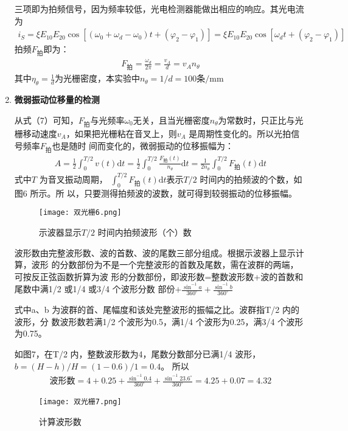 \documentclass[dvipsnames, svgnames,a4paper,11pt]{article}
\renewcommand{\d}{\mathrm{d}}
\begin{document}
\begin{enumerate}
    三项即为拍频信号，因为频率较低，光电检测器能做出相应的响应。其光电流为
    \begin{align*}
        i_S=\xi{E_{10}E_{20}\cos[(\omega_0+\omega_d-\omega_0)t+(\varphi_2-\varphi_1)]}=\xi{E_{10}E_{20}\cos[\omega_d t+(\varphi_2-\varphi_1)]}
    \end{align*}
    拍频$F_\text{拍}$即为：
    \begin{align}
        F_\text{拍}=\frac{\omega_d}{2\pi}=\frac{v_A}{d}=v_An_\theta
    \end{align}
    其中$\eta_\theta=\frac{1}{d}$为光栅密度，本实验中$n_\theta=1/d=100\text{条/mm}$
    \item \textbf{微弱振动位移量的检测}\par
    从式（7）可知，$F_\text{拍}$与光频率$\omega_0$无关，且当光栅密度$n_\theta$为常数时，只正比与光栅移动速度$v_A$，如果把光栅粘在音叉上，则$v_A$ 是周期性变化的。所以光拍信号频率$F_\text{拍}$也是随时
    间而变化的，微弱振动的位移振幅为：
    \begin{align}
        A=\frac{1}{2}\int_{0}^{T/2}v(t)\d t=\frac{1}{2}\int_{0}^{T/2}\frac{F_\text{拍}(t)}{n_\theta}\d t=\frac{1}{2n_\theta}\int_{0}^{T/2}F_\text{拍}(t)\d t
    \end{align}
    式中$T$ 为音叉振动周期， $\int_{0}^{T/2}F_\text{拍}(t)\d t$表示$T/2$ 时间内的拍频波的个数，如图6 所示。所
    以，只要测得拍频波的波数，就可得到较弱振动的位移振幅。
    \begin{figure}[H]
        \centering
        \texttt{[image: 双光栅6.png]}
        \caption{示波器显示$T/2$ 时间内拍频波形（个）数}
    \end{figure} 
    波形数由完整波形数、波的首数、波的尾数三部分组成。根据示波器上显示计算，波形
    的分数部份为不是一个完整波形的首数及尾数，需在波群的两端，可按反正弦函数折算为波
    形的分数部份，即波形数=整数波形数+波的首数和尾数中满1/2 或1/4 或3/4 个波形分数
    部份$+\frac{\sin^{-1}a}{360^\circ}+\frac{\sin^{-1}b}{360^\circ}$
    
    式中a、b 为波群的首、尾幅度和该处完整波形的振幅之比。波群指T/2 内的波形，分
    数波形数若满1/2 个波形为0.5，满1/4 个波形为0.25，满3/4 个波形为0.75。

    如图7，在T/2 内，整数波形数为4，尾数分数部分已满1/4 波形，$b=(H-h)/H=(1-0.6)/1=0.4$。
    所以
    \begin{align*}
        \text{波形数}=4+0.25+\frac{\sin^{-1}0.4}{360^\circ}+\frac{\sin^{-1}23.6^\circ}{360^\circ}=4.25+0.07=4.32
    \end{align*}
    \begin{figure}[H]
        \centering
        \texttt{[image: 双光栅7.png]}
        \caption{计算波形数}
    \end{figure} 
\end{enumerate}
\end{document}
